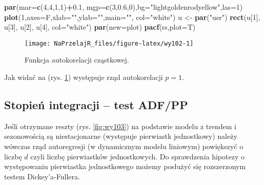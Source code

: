 \documentclass[polish,]{book}
\newenvironment{Shaded}{\begin{snugshade}}{\end{snugshade}}
\newcommand{\DataTypeTok}[1]{\textcolor[rgb]{0.13,0.29,0.53}{#1}}
\newcommand{\DecValTok}[1]{\textcolor[rgb]{0.00,0.00,0.81}{#1}}
\newcommand{\FloatTok}[1]{\textcolor[rgb]{0.00,0.00,0.81}{#1}}
\newcommand{\KeywordTok}[1]{\textcolor[rgb]{0.13,0.29,0.53}{\textbf{#1}}}
\newcommand{\NormalTok}[1]{#1}
\newcommand{\OperatorTok}[1]{\textcolor[rgb]{0.81,0.36,0.00}{\textbf{#1}}}
\newcommand{\StringTok}[1]{\textcolor[rgb]{0.31,0.60,0.02}{#1}}
\begin{document}
\begin{Shaded}
\begin{Highlighting}[]
\KeywordTok{par}\NormalTok{(}\DataTypeTok{mar=}\KeywordTok{c}\NormalTok{(}\DecValTok{4}\NormalTok{,}\DecValTok{4}\NormalTok{,}\DecValTok{1}\NormalTok{,}\DecValTok{1}\NormalTok{)}\OperatorTok{+}\FloatTok{0.1}\NormalTok{, }\DataTypeTok{mgp=}\KeywordTok{c}\NormalTok{(}\DecValTok{3}\NormalTok{,}\FloatTok{0.6}\NormalTok{,}\DecValTok{0}\NormalTok{),}\DataTypeTok{bg=}\StringTok{"lightgoldenrodyellow"}\NormalTok{,}\DataTypeTok{las=}\DecValTok{1}\NormalTok{)}
\KeywordTok{plot}\NormalTok{(}\DecValTok{1}\NormalTok{,}\DataTypeTok{axes=}\NormalTok{F,}\DataTypeTok{xlab=}\StringTok{""}\NormalTok{,}\DataTypeTok{ylab=}\StringTok{""}\NormalTok{,}\DataTypeTok{main=}\StringTok{""}\NormalTok{, }\DataTypeTok{col=}\StringTok{"white"}\NormalTok{)}
\NormalTok{u <-}\StringTok{ }\KeywordTok{par}\NormalTok{(}\StringTok{"usr"}\NormalTok{)}
\KeywordTok{rect}\NormalTok{(u[}\DecValTok{1}\NormalTok{], u[}\DecValTok{3}\NormalTok{], u[}\DecValTok{2}\NormalTok{], u[}\DecValTok{4}\NormalTok{], }\DataTypeTok{col=}\StringTok{"white"}\NormalTok{)}
\KeywordTok{par}\NormalTok{(}\DataTypeTok{new=}\NormalTok{plot)}
\KeywordTok{pacf}\NormalTok{(rs,}\DataTypeTok{plot=}\NormalTok{T)}
\end{Highlighting}
\end{Shaded}

\begin{figure}[h]

{\centering \texttt{[image: NaPrzelajR\_files/figure-latex/wy102-1]} 

}

\caption{Funkcja autokorelacji cząstkowej.}\label{fig:wy102}
\end{figure}

Jak widać na (rys. \ref{fig:wy102}) występuje rząd autokorelacji \(p = 1\).

\hypertarget{part_10.2.4}{%
\subsection{Stopień integracji -- test ADF/PP}\label{part_10.2.4}}

Jeśli otrzymane reszty (rys. \ref{fig:wy103}) na podstawie modelu z trendem i sezonowością są niestacjonarne (występuje pierwiastk jednostkowy) należy wówczas rząd
autoregresji (w dynamicznym modelu liniowym) powiększyć o liczbę \(d\) czyli liczbę
pierwiastków jednostkowych. Do sprawdzenia hipotezy o występowaniu pierwiastka
jednostkowego możemy posłużyć się rozszerzonym testem Dickey'a-Fullera.
\end{document}
